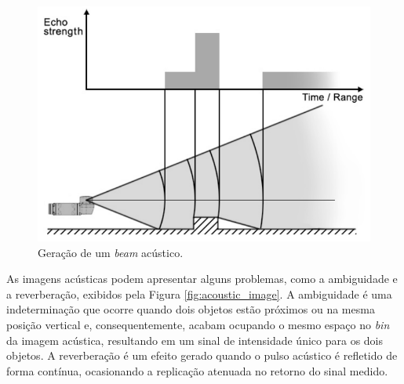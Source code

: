 \begin{figure}[H]
    \centering
    \includegraphics[scale=0.4]{dados/figuras/acoustic_beam.png}
    \caption{Geração de um \textit{beam} acústico.}
    \vspace{-0.8em}
    \label{fig:acoustic_beam}
\end{figure}

As imagens acústicas podem apresentar alguns problemas, como a ambiguidade e a reverberação, exibidos pela Figura \ref{fig:acoustic_image}. 
A ambiguidade é uma indeterminação que ocorre quando dois objetos estão próximos ou na mesma posição vertical e, consequentemente, acabam ocupando o mesmo espaço no \textit{bin} da imagem acústica, resultando em um sinal de intensidade único para os dois objetos.
A reverberação é um efeito gerado quando o pulso acústico é refletido de forma contínua, ocasionando a replicação atenuada no retorno do sinal medido.


